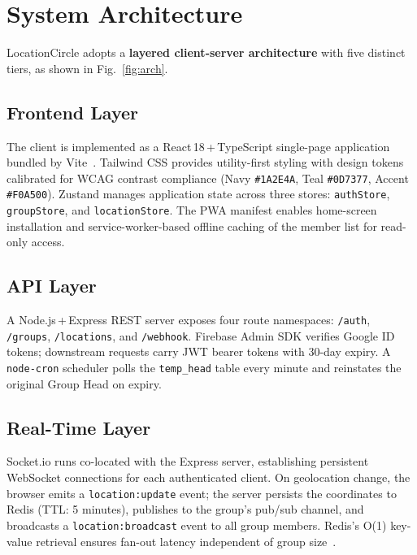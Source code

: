 \documentclass[conference]{IEEEtran}
\begin{document}
\section{System Architecture}
\label{sec:arch}

LocationCircle adopts a \textbf{layered client-server architecture}
with five distinct tiers, as shown in Fig.~\ref{fig:arch}.

\subsection{Frontend Layer}

The client is implemented as a React\,18\,+\,TypeScript single-page
application bundled by Vite~\cite{vite}. Tailwind CSS provides
utility-first styling with design tokens calibrated for WCAG contrast
compliance (Navy \texttt{\#1A2E4A}, Teal \texttt{\#0D7377}, Accent
\texttt{\#F0A500}). Zustand manages application state across three
stores: \texttt{authStore}, \texttt{groupStore}, and
\texttt{locationStore}. The PWA manifest enables home-screen
installation and service-worker-based offline caching of the member
list for read-only access.

\subsection{API Layer}

A Node.js\,+\,Express REST server exposes four route namespaces:
\texttt{/auth}, \texttt{/groups}, \texttt{/locations}, and
\texttt{/webhook}. Firebase Admin SDK verifies Google ID tokens;
downstream requests carry JWT bearer tokens with 30-day expiry.
A \texttt{node-cron} scheduler polls the \texttt{temp\_head} table
every minute and reinstates the original Group Head on expiry.

\subsection{Real-Time Layer}

Socket.io runs co-located with the Express server, establishing
persistent WebSocket connections for each authenticated client.
On geolocation change, the browser emits a \texttt{location:update}
event; the server persists the coordinates to Redis (TTL: 5 minutes),
publishes to the group's pub/sub channel, and broadcasts a
\texttt{location:broadcast} event to all group members. Redis's
O(1) key-value retrieval ensures fan-out latency independent of group
size~\cite{redis2020}.
\end{document}
